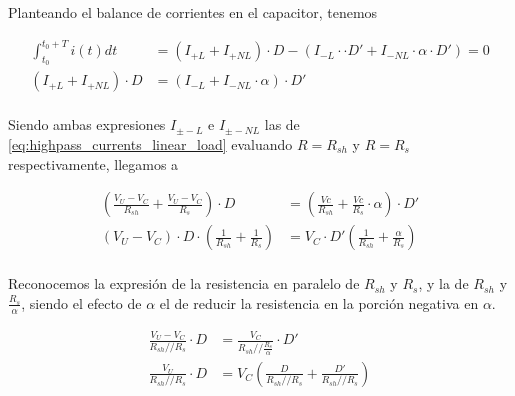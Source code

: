 Planteando el balance de corrientes en el capacitor, tenemos

\begin{equation}
    \label{eq:current_balance_capacitor_linear_load}
    \begin{aligned}
        \int_{t_0}^{t_0+T} i(t)dt &= \left( I_{+L} + I_{+NL} \right) \cdot D -
        \left( I_{-L} \cdot \cdot D' + I_{-NL} \cdot \alpha \cdot D'
        \right) = 0 \\
        \left( I_{+L} + I_{+NL} \right) \cdot D &= \left( I_{-L} + I_{-NL} \cdot
        \alpha \right) \cdot D' \\
    \end{aligned}
\end{equation}

Siendo ambas expresiones $I_{\pm-L}$ e $I_{\pm-NL}$ las de
\ref{eq:highpass_currents_linear_load} evaluando $R=R_{sh}$ y $R=R_{s}$
respectivamente, llegamos a

\begin{equation}
    \label{eq:vc_non_linear_load_with_shunt_0}
    \begin{aligned}
        \left( \frac{V_U-V_C}{R_{sh}} + \frac{V_U-V_C}{R_{s}} \right) \cdot D &=
        \left( \frac{Vc}{R_{sh}} + \frac{Vc}{R_{s}} \cdot \alpha \right) \cdot D' \\
        \left( V_U - V_C \right) \cdot D \cdot \left( \frac{1}{R_{sh}} +
        \frac{1}{R_s} \right) &= V_C \cdot D' \left( \frac{1}{R_{sh}} +
        \frac{\alpha}{R_s} \right) \\
    \end{aligned}
\end{equation}

Reconocemos la expresión de la resistencia en paralelo de $R_{sh}$ y $R_s$, y la
de $R_{sh}$ y $\frac{R_s}{\alpha}$, siendo el efecto de $\alpha$ el de reducir
la resistencia en la porción negativa en $\alpha$.

\begin{equation}
    \label{eq:vc_non_linear_load_with_shunt_1}
    \begin{aligned}
        \frac{V_U-V_C}{R_{sh} // R_{s}} \cdot D &= \frac{V_C}{R_{sh} //
        \frac{R_{s}}{\alpha}} \cdot D'  \\
        \frac{V_U}{R_{sh} // R_{s}} \cdot D &= V_C \left( \frac{D}{R_{sh}
        // R_{s}} + \frac{D'}{R_{sh} // R_{s}} \right) \\
    \end{aligned}
\end{equation}


